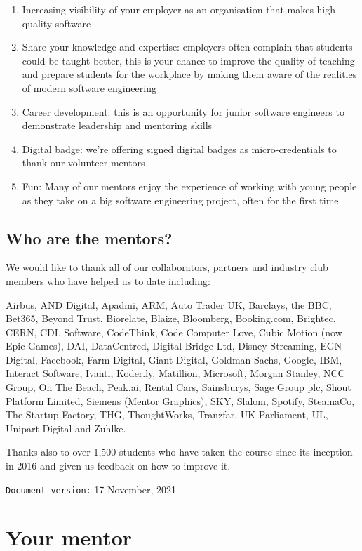 \documentclass[
]{book}
\providecommand{\tightlist}{%
  \setlength{\itemsep}{0pt}\setlength{\parskip}{0pt}}
\begin{document}
\begin{enumerate}
\def\labelenumi{\arabic{enumi}.}
\tightlist
\item
  Increasing visibility of your employer as an organisation that makes high quality software
\item
  Share your knowledge and expertise: employers often complain that students could be taught better, this is your chance to improve the quality of teaching and prepare students for the workplace by making them aware of the realities of modern software engineering
\item
  Career development: this is an opportunity for junior software engineers to demonstrate leadership and mentoring skills
\item
  Digital badge: we're offering signed digital badges as micro-credentials to thank our volunteer mentors
\item
  Fun: Many of our mentors enjoy the experience of working with young people as they take on a big software engineering project, often for the first time
\end{enumerate}

\hypertarget{thanks}{%
\section{Who are the mentors?}\label{thanks}}

We would like to thank all of our collaborators, partners and industry club members who have helped us to date including:

Airbus, AND Digital, Apadmi, ARM, Auto Trader UK, Barclays, the BBC, Bet365, Beyond Trust, Biorelate, Blaize, Bloomberg, Booking.com, Brightec, CERN, CDL Software, CodeThink, Code Computer Love, Cubic Motion (now Epic Games), DAI, DataCentred, Digital Bridge Ltd, Disney Streaming, EGN Digital, Facebook, Farm Digital, Giant Digital, Goldman Sachs, Google, IBM, Interact Software, Ivanti, Koder.ly, Matillion, Microsoft, Morgan Stanley, NCC Group, On The Beach, Peak.ai, Rental Cars, Sainsburys, Sage Group plc, Shout Platform Limited, Siemens (Mentor Graphics), SKY, Slalom, Spotify, SteamaCo, The Startup Factory, THG, ThoughtWorks, Tranzfar, UK Parliament, UL, Unipart Digital and Zuhlke.

Thanks also to over 1,500 students who have taken the course since its inception in 2016 and given us feedback on how to improve it.

\texttt{Document\ version:} 17 November, 2021

\hypertarget{ourmentor}{%
\chapter{Your mentor}\label{ourmentor}}
\end{document}
